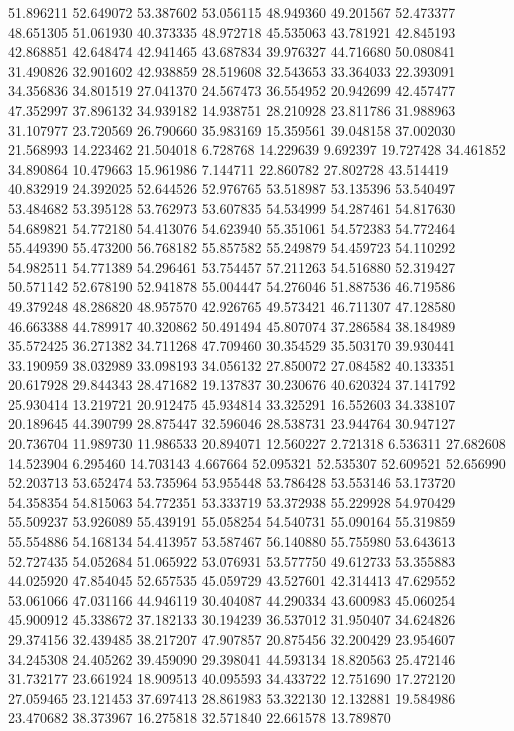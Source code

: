51.896211
52.649072
53.387602
53.056115
48.949360
49.201567
52.473377
48.651305
51.061930
40.373335
48.972718
45.535063
43.781921
42.845193
42.868851
42.648474
42.941465
43.687834
39.976327
44.716680
50.080841
31.490826
32.901602
42.938859
28.519608
32.543653
33.364033
22.393091
34.356836
34.801519
27.041370
24.567473
36.554952
20.942699
42.457477
47.352997
37.896132
34.939182
14.938751
28.210928
23.811786
31.988963
31.107977
23.720569
26.790660
35.983169
15.359561
39.048158
37.002030
21.568993
14.223462
21.504018
6.728768
14.229639
9.692397
19.727428
34.461852
34.890864
10.479663
15.961986
7.144711
22.860782
27.802728
43.514419
40.832919
24.392025
52.644526
52.976765
53.518987
53.135396
53.540497
53.484682
53.395128
53.762973
53.607835
54.534999
54.287461
54.817630
54.689821
54.772180
54.413076
54.623940
55.351061
54.572383
54.772464
55.449390
55.473200
56.768182
55.857582
55.249879
54.459723
54.110292
54.982511
54.771389
54.296461
53.754457
57.211263
54.516880
52.319427
50.571142
52.678190
52.941878
55.004447
54.276046
51.887536
46.719586
49.379248
48.286820
48.957570
42.926765
49.573421
46.711307
47.128580
46.663388
44.789917
40.320862
50.491494
45.807074
37.286584
38.184989
35.572425
36.271382
34.711268
47.709460
30.354529
35.503170
39.930441
33.190959
38.032989
33.098193
34.056132
27.850072
27.084582
40.133351
20.617928
29.844343
28.471682
19.137837
30.230676
40.620324
37.141792
25.930414
13.219721
20.912475
45.934814
33.325291
16.552603
34.338107
20.189645
44.390799
28.875447
32.596046
28.538731
23.944764
30.947127
20.736704
11.989730
11.986533
20.894071
12.560227
2.721318
6.536311
27.682608
14.523904
6.295460
14.703143
4.667664
52.095321
52.535307
52.609521
52.656990
52.203713
53.652474
53.735964
53.955448
53.786428
53.553146
53.173720
54.358354
54.815063
54.772351
53.333719
53.372938
55.229928
54.970429
55.509237
53.926089
55.439191
55.058254
54.540731
55.090164
55.319859
55.554886
54.168134
54.413957
53.587467
56.140880
55.755980
53.643613
52.727435
54.052684
51.065922
53.076931
53.577750
49.612733
53.355883
44.025920
47.854045
52.657535
45.059729
43.527601
42.314413
47.629552
53.061066
47.031166
44.946119
30.404087
44.290334
43.600983
45.060254
45.900912
45.338672
37.182133
30.194239
36.537012
31.950407
34.624826
29.374156
32.439485
38.217207
47.907857
20.875456
32.200429
23.954607
34.245308
24.405262
39.459090
29.398041
44.593134
18.820563
25.472146
31.732177
23.661924
18.909513
40.095593
34.433722
12.751690
17.272120
27.059465
23.121453
37.697413
28.861983
53.322130
12.132881
19.584986
23.470682
38.373967
16.275818
32.571840
22.661578
13.789870
